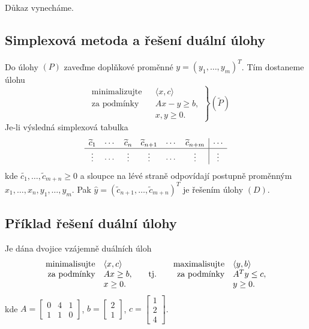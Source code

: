 Důkaz vynecháme.

\subsection{Simplexová metoda a řešení duální úlohy}\label{simplDual}
Do úlohy $(P)$ zaveďme doplňkové proměnné $y = (y_1, \dots, y_m)^T$. Tím dostaneme úlohu
\[
    \left.\begin{aligned}
        &\text{minimalizujte}&& \langle x, c \rangle \\
        &\text{za podmínky}  && Ax -y \geq b, \\
        &                    && x,y \geq 0.
    \end{aligned}
    \right\} (\widetilde{P})
\]
Je-li výsledná simplexová tabulka
\[
    \begin{array}{cccc cc|c}
        \widetilde{c}_1 & \cdots & \widetilde{c}_n & \widetilde{c}_{n+1} & \cdots & \widetilde{c}_{n+m} & \cdots \\ \hline
        \vdots      & \cdots & \vdots      & \vdots          & \cdots & \vdots          & \vdots \\
    \end{array}
\]
kde $\widetilde{c_1}, \dots, \widetilde{c}_{m+n} \geq 0$ a sloupce na lévé straně odpovídají postupně proměnným 
$x_1, \dots, x_n, y_1, \dots, y_m$. Pak $\hat y = \left(\widetilde{c}_{n+1},\dots, \widetilde{c}_{m+n}\right)^T$ je řešením 
úlohy $(D)$.

\subsection{Příklad řešení duální úlohy}
Je dána dvojice vzájemně duálních úloh
\[
    \begin{array}{r@{\quad}l@{\qquad}c@{\qquad}r@{\quad}l}
        \text{minimalisujte}& \langle x,c \rangle&           & \text{maximalisujte}& \langle y,b \rangle \\
        \text{za podmínky}  & Ax \geq b,         & \text{tj.}&\text{za podmínky}   & A^Ty \leq c, \\
                            & x \geq 0.          &           &                     & y \geq 0.
    \end{array}
\]
kde $A = 
\begin{bmatrix}
    0 & 4 & 1 \\
    1 & 1 & 0
\end{bmatrix}$, $b = 
\begin{bmatrix}
    2 \\ 1
\end{bmatrix}$, $c = 
\begin{bmatrix}
    1 \\ 2 \\ 4
\end{bmatrix}$.

